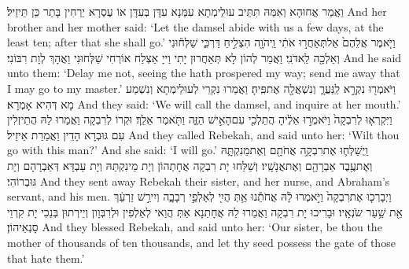 {וַאֲמַר אֲחוּהָא וְאִמַּהּ תִּתֵּיב עוּלֵימְתָא עִמַּנָא עִדָּן בְּעִדָּן אוֹ עֶסְרָא יַרְחִין בָּתַר כֵּן תֵּיזֵיל׃}
{And her brother and her mother said: ‘Let the damsel abide with us a few days, at the least ten; after that she shall go.’}{}
{וַיֹּ֤אמֶר אֲלֵהֶם֙ אַל\maqqaf תְּאַחֲר֣וּ אֹתִ֔י וַֽיהֹוָ֖ה הִצְלִ֣יחַ דַּרְכִּ֑י שַׁלְּח֕וּנִי וְאֵלְכָ֖ה לַֽאדֹנִֽי׃}
{וַאֲמַר לְהוֹן לָא תְּאַחֲרוּן יָתִי וַייָ אַצְלַח אוֹרְחִי שַׁלְּחוּנִי וַאֲהָךְ לְוָת רִבּוֹנִי׃}
{And he said unto them: ‘Delay me not, seeing the \lord\space hath prospered my way; send me away that I may go to my master.’}{}
{וַיֹּאמְר֖וּ נִקְרָ֣א לַֽנַּעֲרָ֑ וְנִשְׁאֲלָ֖ה אֶת\maqqaf פִּֽיהָ׃}
{וַאֲמַרוּ נִקְרֵי לְעוּלֵימְתָא וְנִשְׁמַע מָא דְּהִיא אָמְרָא׃}
{And they said: ‘We will call the damsel, and inquire at her mouth.’}{}
{וַיִּקְרְא֤וּ לְרִבְקָה֙ וַיֹּאמְר֣וּ אֵלֶ֔יהָ הֲתֵלְכִ֖י עִם\maqqaf הָאִ֣ישׁ הַזֶּ֑ה וַתֹּ֖אמֶר אֵלֵֽךְ׃}
{וּקְרוֹ לְרִבְקָה וַאֲמַרוּ לַהּ הֲתֵיזְלִין עִם גּוּבְרָא הָדֵין וַאֲמַרַת אֵיזֵיל׃}
{And they called Rebekah, and said unto her: ‘Wilt thou go with this man?’ And she said: ‘I will go.’}{}
{וַֽיְשַׁלְּח֛וּ אֶת\maqqaf רִבְקָ֥ה אֲחֹתָ֖ם וְאֶת\maqqaf מֵנִקְתָּ֑הּ וְאֶת\maqqaf עֶ֥בֶד אַבְרָהָ֖ם וְאֶת\maqqaf אֲנָשָֽׁיו׃}
{וְשַׁלַּחוּ יָת רִבְקָה אֲחָתְהוֹן וְיָת מֵינִקְתַּהּ וְיָת עַבְדָּא דְּאַבְרָהָם וְיָת גּוּבְרוֹהִי׃}
{And they sent away Rebekah their sister, and her nurse, and Abraham’s servant, and his men.}{}
{וַיְבָרְכ֤וּ אֶת\maqqaf רִבְקָה֙ וַיֹּ֣אמְרוּ לָ֔הּ אֲחֹתֵ֕נוּ אַ֥תְּ הֲיִ֖י לְאַלְפֵ֣י רְבָבָ֑ה וְיִירַ֣שׁ זַרְעֵ֔ךְ אֵ֖ת שַׁ֥עַר שֹׂנְאָֽיו׃}
{וּבָרִיכוּ יָת רִבְקָה וַאֲמַרוּ לַהּ אֲחָתַנָא אַתְּ הֲוַאי לְאַלְפִין וּלְרִבְּוָון וְיֵירְתוּן בְּנַכִי יָת קִרְוֵי סָנְאֵיהוֹן׃}
{And they blessed Rebekah, and said unto her: ‘Our sister, be thou the mother of thousands of ten thousands, and let thy seed possess the gate of those that hate them.’}{}
